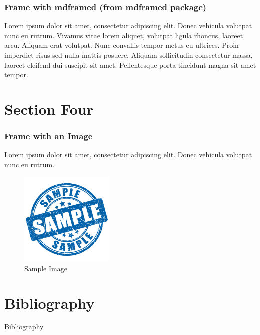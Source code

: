 \documentclass{beamer}
\begin{document}
\begin{frame}
    \frametitle{Frame with mdframed (from mdframed package)}
    \begin{mdframed}
        Lorem ipsum dolor sit amet, consectetur adipiscing elit. Donec vehicula volutpat nunc eu rutrum. Vivamus vitae lorem aliquet, volutpat ligula rhoncus, laoreet arcu. Aliquam erat volutpat. Nunc convallis tempor metus eu ultrices. Proin imperdiet risus sed nulla mattis posuere. Aliquam sollicitudin consectetur massa, laoreet eleifend dui suscipit sit amet. Pellentesque porta tincidunt magna sit amet tempor.
    \end{mdframed}
    
\end{frame}

\section{Section Four}
\sectionframe{}

\begin{frame}
    \frametitle{Frame with an Image}
    Lorem ipsum dolor sit amet, consectetur adipiscing elit. Donec vehicula volutpat nunc eu rutrum. 
    \begin{figure}
        \centering
        \includegraphics[width=0.4\textwidth]{assets/sample.jpg}
        \caption{Sample Image}
    \end{figure}
\end{frame}

\section{Bibliography}
\begin{frame}[allowframebreaks]{Bibliography}
	\footnotesize
	\nocite{*}
	
	
\end{frame}
\end{document}
